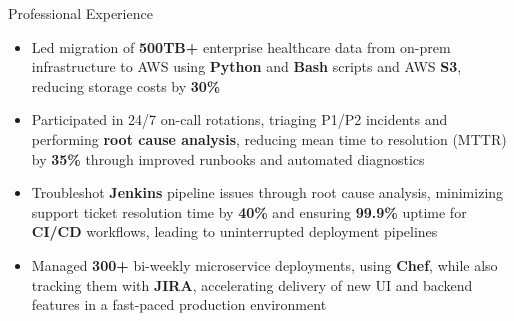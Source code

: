 \documentclass{resume}
\begin{document}
\begin{experienceSection}{Professional Experience}
    \experienceItem[
        company={Cerner Healthcare (Oracle Health)},
        location={Bangalore, India},
        position={System Engineer},
        duration={May 2020 - Jul 2023}
    ]
    \begin{itemize}
        \itemsep -6pt {}
        \item Led migration of \textbf{500TB+} enterprise healthcare data from on-prem infrastructure to AWS using \textbf{Python} and \textbf{Bash} scripts and AWS \textbf{S3}, reducing storage costs by \textbf{30\%}
        \item Participated in 24/7 on-call rotations, triaging P1/P2 incidents and performing\textbf{ root cause analysis}, reducing mean time to resolution (MTTR) by \textbf{35\%} through improved runbooks and automated diagnostics
        \item Troubleshot \textbf{Jenkins} pipeline issues through root cause analysis, minimizing support ticket resolution time by \textbf{40\%} and ensuring \textbf{99.9\%} uptime for \textbf{CI/CD} workflows, leading to uninterrupted deployment pipelines
        \item Managed \textbf{300+} bi-weekly microservice deployments, using \textbf{Chef}, while also tracking them with \textbf{JIRA}, accelerating delivery of new UI and backend features in a fast-paced production environment
    \end{itemize}

\end{experienceSection}
\end{document}
